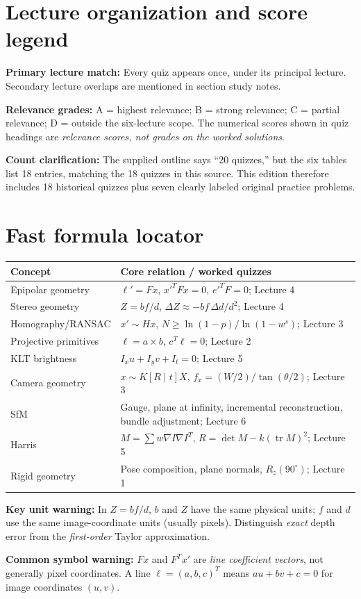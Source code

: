 \documentclass[10pt,letterpaper]{article}
\begin{document}
\section*{Lecture organization and score legend}
\textbf{Primary lecture match:} Every quiz appears once, under its principal lecture. Secondary lecture overlaps are mentioned in section study notes.\par
\textbf{Relevance grades:} A = highest relevance; B = strong relevance; C = partial relevance; D = outside the six-lecture scope. The numerical scores shown in quiz headings are \emph{relevance scores, not grades on the worked solutions}.\par
\textbf{Count clarification:} The supplied outline says ``20 quizzes,'' but the six tables list 18 entries, matching the 18 quizzes in this source. This edition therefore includes 18 historical quizzes plus seven clearly labeled original practice problems.\par
\medskip
\section*{Fast formula locator}
\begin{tabular}{@{}p{.28\linewidth}p{.65\linewidth}@{}}
\toprule
\textbf{Concept} & \textbf{Core relation / worked quizzes}\\\midrule
Epipolar geometry & $\ell'=Fx$, $x'^TFx=0$, $e'^TF=0$; Lecture 4\\
Stereo geometry & $Z=bf/d$, $\Delta Z\approx-bf\,\Delta d/d^2$; Lecture 4\\
Homography/RANSAC & $x'\sim Hx$, $N\geq\ln(1-p)/\ln(1-w^s)$; Lecture 3\\
Projective primitives & $\ell=a\times b$, $c^T\ell=0$; Lecture 2\\
KLT brightness & $I_xu+I_yv+I_t=0$; Lecture 5\\
Camera geometry & $x\sim K[R\mid t]X$, $f_x=(W/2)/\tan(\theta/2)$; Lecture 3\\
SfM & Gauge, plane at infinity, incremental reconstruction, bundle adjustment; Lecture 6\\
Harris & $M=\sum w\nabla I\nabla I^T$, $R=\det M-k(\operatorname{tr}M)^2$; Lecture 5\\
Rigid geometry & Pose composition, plane normals, $R_z(90^\circ)$; Lecture 1\\
\bottomrule
\end{tabular}
\vspace{10pt}
\textbf{Key unit warning:} In $Z=bf/d$, $b$ and $Z$ have the same physical units; $f$ and $d$ use the same image-coordinate units (usually pixels). Distinguish \emph{exact} depth error from the \emph{first-order} Taylor approximation.\par
\textbf{Common symbol warning:} $Fx$ and $F^Tx'$ are \emph{line coefficient vectors}, not generally pixel coordinates. A line $\ell=(a,b,c)^T$ means $au+bv+c=0$ for image coordinates $(u,v)$.\par
\end{document}

